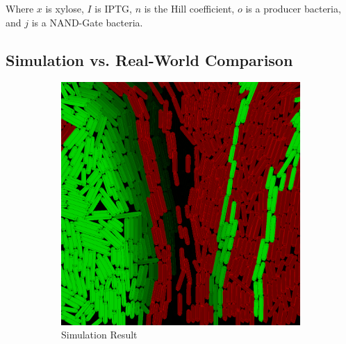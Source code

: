\documentclass[11pt,a4paper]{article}
\begin{document}
Where $x$ is xylose, $I$ is IPTG, $n$ is the Hill coefficient, $o$ is a producer bacteria, and $j$ is a NAND-Gate bacteria.

\subsection{Simulation vs. Real-World Comparison}

\begin{figure}[H] 
    \centering
    \begin{subfigure}[b]{0.45\textwidth}
        \centering
        \includegraphics[width=\textwidth]{../figures/nonMono.png}
        \caption{Simulation Result}
        \label{fig:mono_dec_sim}
    \end{subfigure}
    \hfill
    \begin{subfigure}[b]{0.45\textwidth} 
        \centering

\end{subfigure}
\end{figure}
\end{document}
